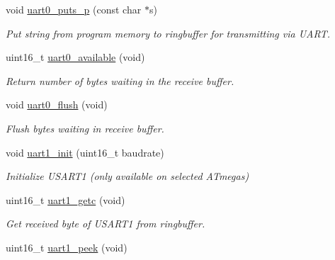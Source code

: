 \begin{DoxyCompactItemize}
void \hyperlink{group__avr-uart_gad55b367ecb822ff1c172c78af6013fe5}{uart0\+\_\+puts\+\_\+p} (const char $\ast$s)
\begin{DoxyCompactList}\small\item\em Put string from program memory to ringbuffer for transmitting via U\+A\+R\+T. \end{DoxyCompactList}\item 
uint16\+\_\+t \hyperlink{group__avr-uart_gac369ee64442157556e517078029e9aab}{uart0\+\_\+available} (void)
\begin{DoxyCompactList}\small\item\em Return number of bytes waiting in the receive buffer. \end{DoxyCompactList}\item 
\hypertarget{group__avr-uart_gab3e2b412a31f1d05a9a5be70f4b01109}{}void \hyperlink{group__avr-uart_gab3e2b412a31f1d05a9a5be70f4b01109}{uart0\+\_\+flush} (void)\label{group__avr-uart_gab3e2b412a31f1d05a9a5be70f4b01109}

\begin{DoxyCompactList}\small\item\em Flush bytes waiting in receive buffer. \end{DoxyCompactList}\item 
void \hyperlink{group__avr-uart_ga31993c01ca0007ecddd47f19e239afe5}{uart1\+\_\+init} (uint16\+\_\+t baudrate)
\begin{DoxyCompactList}\small\item\em Initialize U\+S\+A\+R\+T1 (only available on selected A\+Tmegas) \end{DoxyCompactList}\item 
uint16\+\_\+t \hyperlink{group__avr-uart_ga07e1276e06323b0193b9e011012d9413}{uart1\+\_\+getc} (void)
\begin{DoxyCompactList}\small\item\em Get received byte of U\+S\+A\+R\+T1 from ringbuffer. \end{DoxyCompactList}\item 
\hypertarget{group__avr-uart_ga8b9dbcaa3571f021473f0cae243ad3b2}{}uint16\+\_\+t \hyperlink{group__avr-uart_ga8b9dbcaa3571f021473f0cae243ad3b2}{uart1\+\_\+peek} (void)\label{group__avr-uart_ga8b9dbcaa3571f021473f0cae243ad3b2}


\end{DoxyCompactItemize}
